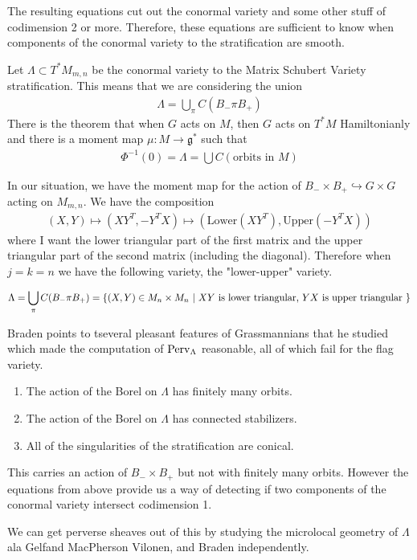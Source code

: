 \documentclass[12pt]{article}
\begin{document}
The resulting equations cut out the conormal variety
and some other stuff of codimension 2 or more. Therefore, these equations are
sufficient to know when components of the conormal variety to the stratification
are smooth.

\vspace{1em}
Let $\Lambda\subset T^*M_{m,n}$ be the conormal variety to the Matrix Schubert
Variety stratification. This means that we are considering the union \begin{align*}
	\Lambda = \bigcup_{\pi} C(B_- \pi B_+)
\end{align*}
There is the theorem that when $G$ acts on $M$, then $G$ acts on $T^*M$ Hamiltonianly and
there is a moment map
$\mu: M \to \mathfrak{g}^*$ such that \begin{align*}
	\Phi^{-1}(0) = \Lambda = \bigcup C(\text{orbits in $M$})
\end{align*}

In our situation, we have the moment map for the action of $B_{-}\times B_{+} \hookrightarrow G\times G$
acting on $M_{m,n}$. We have the composition \begin{align*}
    (X,Y) \mapsto (XY^T,-Y^TX) \mapsto (\text{Lower}(XY^T), \text{Upper}(-Y^TX))
\end{align*} where I want the lower triangular
part of the first matrix and the upper triangular part of the second matrix (including the diagonal).
Therefore when $j=k=n$ we have the following variety, the "lower-upper" variety.

\begin{align*}
	\Lambda = \bigcup_{\pi} C(B_- \pi B_+) = \{ (X,Y) \in M_{n} \times M_n \ \vert \  XY \text{ is lower triangular, } YX \text{ is upper triangular } \}
\end{align*}

\begin{remark}
    [Important] Braden points to tseveral pleasant features of Grassmannians that 
    he studied which made the computation of $\operatorname{Perv}_{\Lambda}$ reasonable, all of which fail 
    for the flag variety.

    \begin{enumerate}
        \item The action of the Borel on $\Lambda$ has finitely many orbits.
        \item The action of the Borel on $\Lambda$ has connected stabilizers.
        \item All of the singularities of the stratification are conical. 
    \end{enumerate}
\end{remark}

This carries an action of $B_{-}\times B_{+}$ but not with finitely many orbits. However
the equations from above provide us a way of detecting if two components
of the conormal variety intersect codimension 1.




We can get perverse sheaves out of this by studying the microlocal geometry of $\Lambda$ ala
Gelfand MacPherson Vilonen, and Braden independently.
\end{document}
